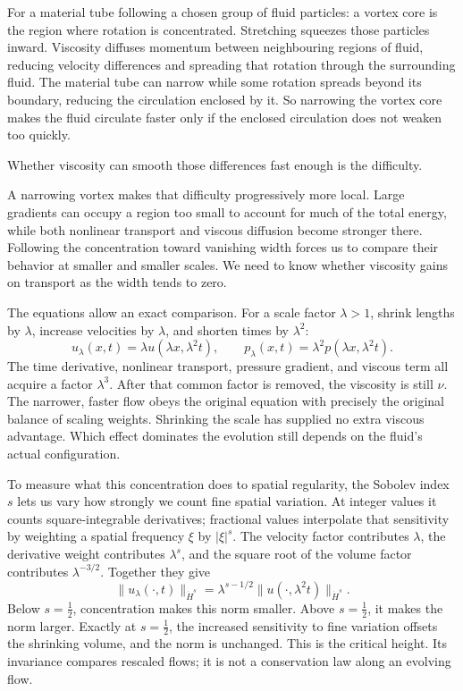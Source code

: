 For a material tube following a chosen group of fluid particles: a vortex
core is the region where rotation is concentrated. Stretching squeezes
those particles inward. Viscosity diffuses momentum between neighbouring
regions of fluid, reducing velocity differences and spreading that rotation
through the surrounding fluid.
The material tube can narrow while some rotation spreads beyond its
boundary, reducing the circulation enclosed by it. So narrowing the vortex
core makes the fluid circulate faster only if the enclosed circulation does
not weaken too quickly.

Whether viscosity can smooth those differences fast enough is the difficulty.

A narrowing vortex makes that difficulty progressively more local. Large
gradients can occupy a region too small to account for much of the total
energy, while both nonlinear transport and viscous diffusion become stronger
there. Following the concentration toward vanishing width forces us to
compare their behavior at smaller and smaller scales. We need to know whether viscosity gains on transport as the width tends
to zero.

The equations allow an exact comparison. For a scale factor \(\lambda>1\),
shrink lengths by \(\lambda\), increase velocities by \(\lambda\), and
shorten times by \(\lambda^2\):
\[
 u_\lambda(x,t)=\lambda u(\lambda x,\lambda^2t),
 \qquad
 p_\lambda(x,t)=\lambda^2p(\lambda x,\lambda^2t).
\]
The time derivative, nonlinear transport, pressure gradient, and viscous
term all acquire a factor \(\lambda^3\). After that common factor is
removed, the viscosity is still \(\nu\). The narrower, faster flow obeys
the original equation with precisely the original balance of scaling
weights. Shrinking the scale has supplied no extra viscous advantage.
Which effect dominates the evolution still depends on the fluid's actual
configuration.

To measure what this concentration does to spatial regularity, the Sobolev
index \(s\) lets us vary how strongly we count fine spatial variation.
At integer values it counts square-integrable derivatives; fractional values
interpolate that sensitivity by weighting a spatial frequency \(\xi\) by
\(\lvert\xi\rvert^s\). The velocity factor contributes \(\lambda\), the
derivative weight contributes \(\lambda^s\), and the square root of the
volume factor contributes \(\lambda^{-3/2}\). Together they give
\[
 \|u_\lambda(\cdot,t)\|_{\dot H^s}
 =\lambda^{s-1/2}\|u(\cdot,\lambda^2t)\|_{\dot H^s}.
\]
Below \(s=\tfrac12\), concentration makes this norm smaller. Above
\(s=\tfrac12\), it makes the norm larger. Exactly at \(s=\tfrac12\),
the increased sensitivity to fine variation offsets the shrinking volume,
and the norm is unchanged. This is the critical height. Its invariance
compares rescaled flows; it is not a conservation law along an evolving flow.

